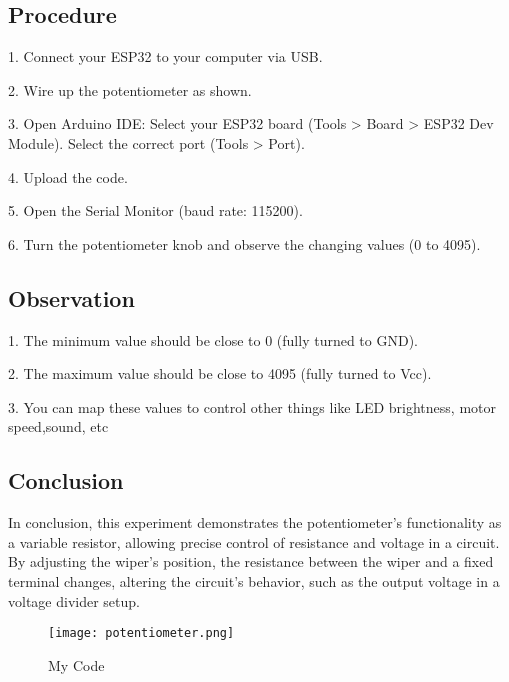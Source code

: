 \documentclass{article}
\begin{document}
\subsection{Procedure}

\item 1. Connect your ESP32 to your computer via USB.
\item 2. Wire up the potentiometer as shown.
\item 3. Open Arduino IDE:
 Select your ESP32 board (Tools > Board > ESP32 Dev Module).
 Select the correct port (Tools > Port).
\item 4. Upload the code.

\item 5. Open the Serial Monitor (baud rate: 115200).
\item 6. Turn the potentiometer knob and observe the changing values (0 to 4095).


\subsection{Observation}
\item  1. The minimum value should be close to 0 (fully turned to GND).

\item  2. The maximum value should be close to 4095 (fully turned to Vcc).
\item  3. You can map these values to control other things like LED brightness, motor speed,sound, etc

\subsection{Conclusion}

In conclusion, this experiment demonstrates the potentiometer’s functionality as a variable resistor, allowing precise control of resistance and voltage in a circuit. By adjusting the wiper’s position, the resistance between the wiper and a fixed terminal changes, altering the circuit’s behavior, such as the output voltage in a voltage divider setup.

\begin{figure}[h]
    \centering
    \texttt{[image: potentiometer.png]}
    \caption{My Code}
    \label{fig:image}
\end{figure}
\end{document}
